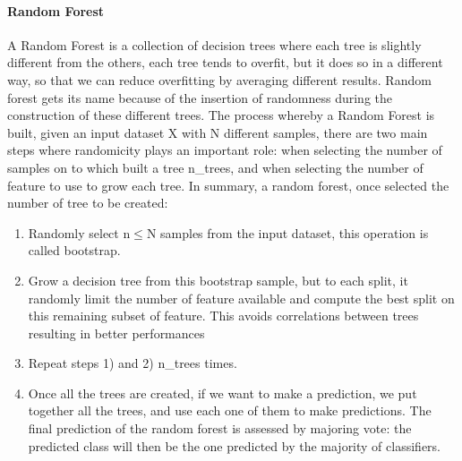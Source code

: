\documentclass[a4paper,11pt]{article}
\begin{document}
\paragraph{Random Forest} \hfill

A Random Forest is a collection of decision trees where each tree is slightly different from the others, each tree tends to overfit, but it does so in a different way, so that we can reduce overfitting by averaging different results.
Random forest gets its name because of the insertion of randomness during the construction of these different trees.
The process whereby a Random Forest is built, given an input dataset X with N different samples, there are two main steps where randomicity plays an important role: when selecting the number of samples on to which built a tree n\_trees, and when selecting the number of feature to use to grow each tree.
In summary, a random forest, once selected the number of tree to be created:
\begin{enumerate}
\item Randomly select n$\leq$N samples from the input dataset, this operation is called bootstrap.
\item Grow a decision tree from this bootstrap sample, but to each split, it randomly limit the number of feature available and compute the best split on this remaining subset of feature. This avoids correlations between trees resulting in better performances
\item Repeat steps 1) and 2) n\_trees times.
\item Once all the trees are created, if we want to make a prediction, we put together all the trees, and use each one of them to make predictions.
The final prediction of the random forest is assessed by majoring vote: the predicted class will then be the one predicted by the majority of classifiers.
\end{enumerate}



\end{document}
